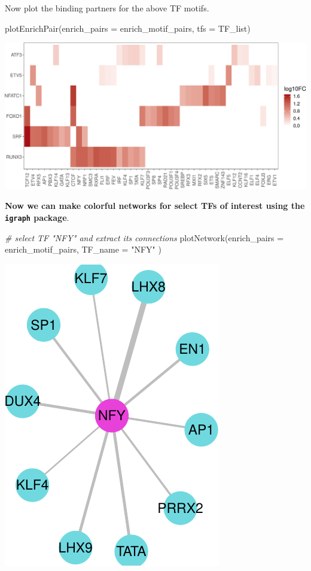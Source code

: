\documentclass[
]{article}
\newenvironment{Shaded}{}{}
\newcommand{\AttributeTok}[1]{\textcolor[rgb]{0.49,0.56,0.16}{#1}}
\newcommand{\CommentTok}[1]{\textcolor[rgb]{0.38,0.63,0.69}{\textit{#1}}}
\newcommand{\FunctionTok}[1]{\textcolor[rgb]{0.02,0.16,0.49}{#1}}
\newcommand{\NormalTok}[1]{#1}
\newcommand{\StringTok}[1]{\textcolor[rgb]{0.25,0.44,0.63}{#1}}
\begin{document}
Now plot the binding partners for the above TF motifs.

\begin{Shaded}
\begin{Highlighting}[]

\FunctionTok{plotEnrichPair}\NormalTok{(}\AttributeTok{enrich\_pairs =}\NormalTok{ enrich\_motif\_pairs,}
               \AttributeTok{tfs =}\NormalTok{ TF\_list)}
\end{Highlighting}
\end{Shaded}

\includegraphics{enrichmotifpairR_user_manual_guide_files/figure-latex/Th1_vs_Th0_5-1.pdf}

\textbf{Now we can make colorful networks for select TFs of interest
using the \texttt{igraph} package}.

\begin{Shaded}
\begin{Highlighting}[]

\CommentTok{\# select TF "NFY" and extract its connections}
\FunctionTok{plotNetwork}\NormalTok{(}\AttributeTok{enrich\_pairs =}\NormalTok{ enrich\_motif\_pairs,}
            \AttributeTok{TF\_name =} \StringTok{"NFY"}
\NormalTok{            )}
\end{Highlighting}
\end{Shaded}

\includegraphics{enrichmotifpairR_user_manual_guide_files/figure-latex/Th1_vs_Th0_6-1.pdf}
\end{document}
